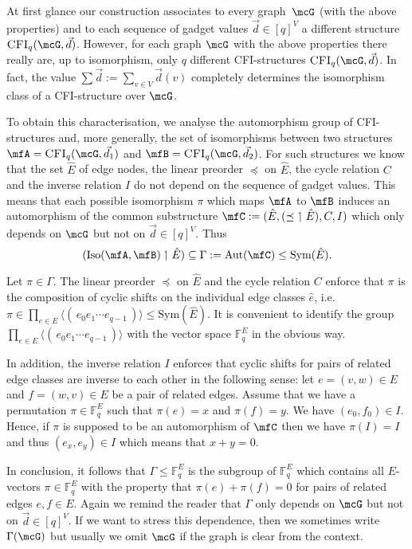 \documentclass[a4paper,UKenglish]{lipics}
\newcommand{\defeq}{:=}
\newcommand{\inseg}[1]{\ensuremath{[#1]}}
\newcommand{\gengroup}[1]{\langle #1 \rangle}
\newcommand{\pcycle}[1]{\ensuremath{( \, #1 \, )}\xspace}
\newcommand{\field}[1]{\mathbb{#1}}
\newcommand{\Aut}{\ensuremath{\text{Aut}}\xspace}
\newcommand{\Sym}{\ensuremath{\text{Sym}}\xspace}
\newcommand{\Iso}{\ensuremath{\text{Iso}}\xspace}
\newcommand{\vct}[1]{\vec{#1}}
\theoremstyle{plain}
\begin{document}
\newcommand{\gadget}{$\text{gadget}$}
At first glance our construction associates to every 
graph~$\mcG$ (with the above properties) and to each
sequence of gadget values $\vec d \in \inseg q^V$  a different structure 
$\CFI(\mcG, \vec d)$.
However, for each graph $\mcG$ with the above properties there really are, up 
to isomorphism, only $q$ different CFI-structures $\CFI(\mcG,\vct d)$.
In fact, the value $\sum \vec d \defeq \sum_{v \in V} \vec d(v)$ 
completely determines the isomorphism class of a CFI-structure over $\mcG$.

\medskip
To obtain this characterisation, we  analyse the automorphism group 
of CFI-structures 
and, more generally, the set of isomorphisms 
between two structures $\mfA = \CFI(\mcG, \vec d_1)$ and 
$\mfB = \CFI(\mcG, \vec d_2)$.
For such structures we know that the set $\hat E$ of edge nodes, the linear 
preorder $\preceq$ on $\hat E$, the cycle relation $C$ and the inverse relation 
$I$ do not depend on the sequence of gadget values. 
This means that each possible isomorphism $\pi$ which maps $\mfA$ to $\mfB$ 
induces an automorphism of the common substructure
$\mfC \defeq (\hat{E}, (\preceq \,\, \upharpoonleft \hat E), C, I)$ which only 
depends on $\mcG$ but not on $\vec d \in \inseg q^V$.
Thus  
\[ (\Iso(\mfA,\mfB) \upharpoonleft \hat E) \subseteq \Gamma \defeq 
\Aut(\mfC) \leq \Sym(\hat E).\]

Let $\pi \in \Gamma$.
The linear preorder $\preceq$ on $\hat{E}$ and the cycle 
relation $C$ enforce that $\pi$ is the composition of
 cyclic shifts on the individual edge classes $\hat{e}$, i.e.\ 
 $\pi \in \prod_{e \in E} 
\gengroup{ \pcycle {e_0 e_1 \cdots e_{q-1}} }  \leq 
\Sym(\hat E)$.
It is convenient to identify the group $\prod_{e \in E} \gengroup{ 
\pcycle {e_0 e_1 \cdots e_{q-1}} }$ with the vector space $\field F_q^E$ in the 
obvious way. 

In addition, the inverse relation $I$ enforces that cyclic shifts for 
pairs of related edge classes are inverse to each other in the following sense: 
let $e = (v,w) \in E$ and $f = (w,v) \in E$ be a pair of related edges.
Assume that we have a permutation $\pi \in \field F_q^E$ such that $\pi(e) = x$ 
and $\pi(f) = y$. We have $(e_0,f_0) \in I$. Hence, if $\pi$ is supposed 
to be an automorphism of $\mfC$ then we have $\pi(I) = I$ and thus 
$(e_x, e_y) \in I$ which means that $x + y = 0$.

In conclusion, it follows that $\Gamma \leq \field F_q^E$ is the subgroup of 
$\field F_q^E$ 
which contains all $E$-vectors $\pi \in \field F_q^E$ with
the property that $\pi(e) + \pi(f) = 0$ for pairs of related edges 
$e, f \in E$. 
Again we remind the reader that $\Gamma$ only depends on $\mcG$ but 
not on $\vec d \in \inseg q^V$. If we want to stress this dependence, then we 
sometimes write $\Gamma(\mcG)$ but usually we omit $\mcG$ if the graph is 
clear from the context.
\end{document}
